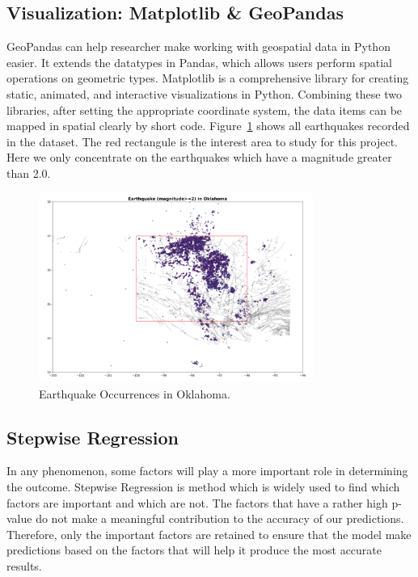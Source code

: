 \documentclass[final-report]{report-template}
\begin{document}
\subsection{Visualization: Matplotlib \& GeoPandas}
GeoPandas can help researcher make working with geospatial data in Python easier. It extends the datatypes in Pandas, which allows users perform spatial operations on geometric types.
Matplotlib is a comprehensive library for creating static, animated, and interactive visualizations in Python.
Combining these two libraries, after setting the appropriate coordinate system, the data items can be mapped in spatial clearly by short code.
Figure~\ref{fig:earthquake_plot} shows all earthquakes recorded in the dataset. The red rectangule is the interest area to study for this project.
Here we only concentrate on the earthquakes which have a magnitude greater than 2.0.
\begin{figure}
    \begin{center}
        \includegraphics[width=0.8\textwidth]{earthquake_plot.png}
    \end{center}
    \caption{\label{fig:earthquake_plot} Earthquake Occurrences in Oklahoma.}
\end{figure}

\subsection{Stepwise Regression}
\label{sec:stepwise}
In any phenomenon, some factors will play a more important role in determining the outcome. Stepwise Regression is method which is widely used to find which factors are important and which are not. 
The factors that have a rather high p-value do not make a meaningful contribution to the accuracy of our predictions. 
Therefore, only the important factors are retained to ensure that the model make predictions based on the factors that will help it produce the most accurate results.
\end{document}
